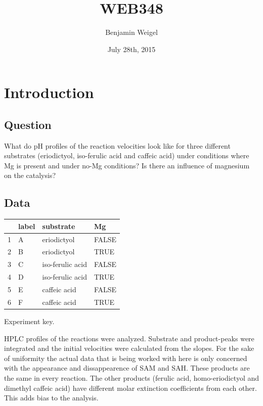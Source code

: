 \documentclass[]{tufte-handout}
\title{WEB348}
\author{Benjamin Weigel}
\date{July 28th, 2015}
\begin{document}
\maketitle



\section{Introduction}\label{introduction}

\subsection{Question}\label{question}

What do pH profiles of the reaction velocities look like for three
different substrates (eriodictyol, iso-ferulic acid and caffeic acid)
under conditions where Mg is present and under no-Mg conditions? Is
there an influence of magnesium on the catalysis?

\subsection{Data}\label{data}

\begin{margintable}
\centering
\begin{tabular}{rlll}
  \toprule
 & label & substrate & Mg \\ 
  \midrule
1 & A & eriodictyol & FALSE \\ 
  2 & B & eriodictyol & TRUE \\ 
  3 & C & iso-ferulic acid & FALSE \\ 
  4 & D & iso-ferulic acid & TRUE \\ 
  5 & E & caffeic acid & FALSE \\ 
  6 & F & caffeic acid & TRUE \\ 
   \bottomrule
\end{tabular}
\caption{Experiment key.} 
\end{margintable}

HPLC profiles of the reactions were analyzed. Substrate and
product-peaks were integrated and the initial velocities were calculated
from the slopes. For the sake of uniformity the actual data that is
being worked with here is only concerned with the appearance and
dissappearence of SAM and SAH. These products are the same in every
reaction. The other products (ferulic acid, homo-eriodictyol and
dimethyl caffeic acid) have different molar extinction coefficients from
each other. This adds bias to the analysis.
\end{document}
